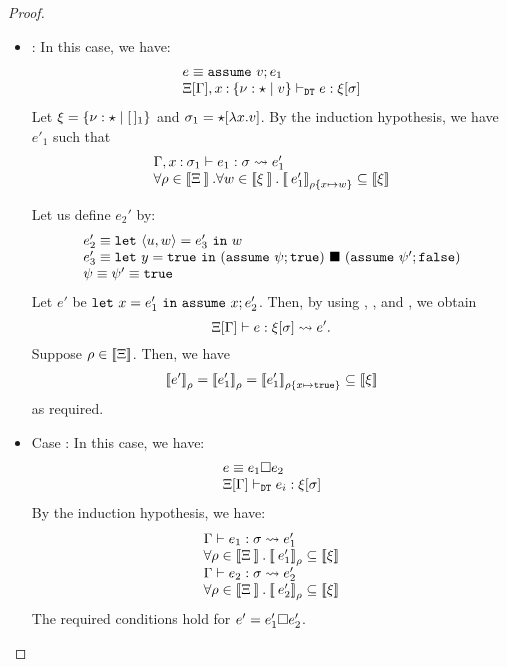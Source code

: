 \begin{proof}
\begin{itemize}
\item \textit{}:
In this case, we have:
\[
\begin{array}{l}
e \equiv \mathtt{assume~}v; e_1\\
\Xi[\Gamma], x\mathbin{:} \{\nu:\star\mid v\} \vdash_{\texttt{DT}} e:\xi[\sigma]
\end{array}
\]
Let \(\xi = \{\nu:\star\mid [\,]_1\}\) and \(\sigma_1 = \star[\lambda x.v]\).
By the induction hypothesis, we have \(e'_1\) such that
\[
\begin{array}{l}
 \T{\Gamma, x\COL \sigma_1}{e_1}{\sigma}{e_1'}\\
\forall \env\in\sem{\Xi}.\forall w\in\sem{\xi}.
  \esem{e_1'}{\rho\set{x\mapsto w}}\subseteq \sem{\xi}
\end{array}
\]

Let us define \(e_2'\) by:
\[
\begin{array}{l}
e_2' \equiv \mathtt{let~}\langle{u,w}\rangle=e_3'\mathtt{~in~}{w}\\
e_3' \equiv \mathtt{let~}y=\mathtt{true}\mathtt{~in~}{(\mathtt{assume~}\psi; \mathtt{true})\ \blacksquare\ (\mathtt{assume~}\psi'; \mathtt{false})}\\
\psi \equiv \psi' \equiv \mathtt{true}\\
\end{array}
\]
Let \(e'\) be \(\mathtt{let~}x=e_1'\mathtt{~in~}{\mathtt{assume~}x; e_2'}\).
Then, by using , , and , we obtain
\[\Xi[\Gamma] \vdash e : \xi[\sigma] \leadsto e'.\]
Suppose \(\rho\in \mathbin{[\![}\Xi\mathbin{]\!]}\). 
Then, we have
\[ \esem{e'}{\env} = \esem{e_1'}{\env}=\esem{e_1'}{\env\set{x\mapsto \TRUE}} \subseteq \sem{\xi}\]
as required.

\item Case :
In this case, we have:
\[
\begin{array}{l}
e \equiv e_1 \square e_2\\
\Xi[\Gamma] \vdash_{\texttt{DT}} e_i: \xi[\sigma]
\end{array}
\]
By the induction hypothesis, we have:
\[
\begin{array}{l}
\T{\Gamma}{e_1}{\sigma}{e_1'}\\
\forall \env\in\sem{\Xi}.
\esem{e'_1}{\env} \subseteq \sem{\xi}\\
\T{\Gamma}{e_2}{\sigma}{e_2'}\\
\forall \env\in\sem{\Xi}.
\esem{e'_2}{\env} \subseteq \sem{\xi}\\
\end{array}
\]
The required conditions hold for 
\(e' = e'_1\square e'_2\).


\end{itemize}
\end{proof}
